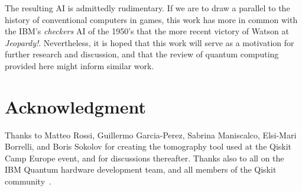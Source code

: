 \documentclass[conference]{IEEEtran}
\begin{document}
The resulting AI is admittedly rudimentary. If we are to draw a parallel to the history of conventional computers in games, this work has more in common with the IBM's \textit{checkers} AI of the 1950's that the more recent victory of Watson at \textit{Jeopardy!}. Nevertheless, it is hoped that this work will serve as a motivation for further research and discussion, and that the review of quantum computing provided here might inform similar work.

\section*{Acknowledgment}

Thanks to Matteo Rossi, Guillermo Garcia-Perez, Sabrina Maniscalco, Elsi-Mari Borrelli, and Boris Sokolov for creating the tomography tool used at the Qiskit Camp Europe event, and for discussions thereafter. Thanks also to all on the IBM Quantum hardware development team, and all members of the Qiskit community~\cite{qiskit}.



\end{document}
